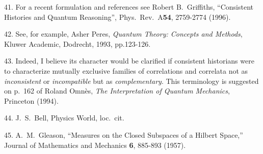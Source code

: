 41.  For a recent formulation and references see Robert B.~Griffiths,
``Consistent Histories and Quantum Reasoning'', Phys.~Rev.~A{\bf 54},
2759-2774 (1996).

42.  See, for example, Asher Peres, {\it Quantum
Theory: Concepts and Methods\/}, Kluwer Academic, Dodrecht, 1993,
pp.123-126.

43.  Indeed, I believe its character would be clarified if consistent
historians were to characterize mutually exclusive families of
correlations and correlata not as {\it inconsistent\/} or {\it
incompatible\/} but as {\it complementary\/}. This terminology is
suggested on p.~162 of Roland Omn\`es, {\it The Interpretation of
Quantum Mechanics\/}, Princeton (1994).

44.  J.~S.~Bell, Physics World, loc.~cit.

45.  A.~M.~Gleason, ``Measures on the Closed Subspaces of a
Hilbert Space,'' Journal of Mathematics and Mechanics {\bf 6}, 885-893
(1957).


\bye
